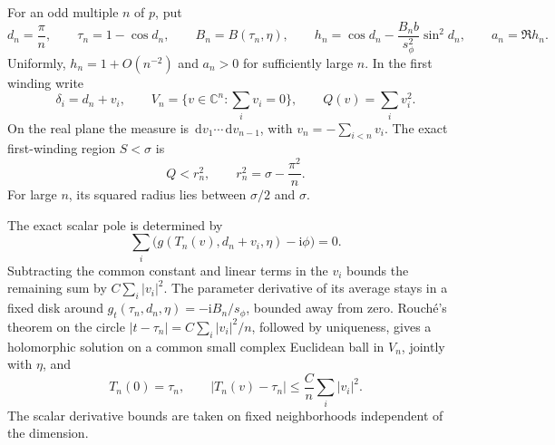\documentclass[11pt]{article}
\numberwithin{equation}{section}
\theoremstyle{definition}
\newcommand{\ii}{\mathrm i}
\newcommand{\dd}{\,\mathrm d}
\begin{document}
For an odd multiple \(n\) of \(p\), put
\begin{equation}
 d_n=\frac\pi n,\qquad \tau_n=1-\cos d_n,\qquad
 B_n=B(\tau_n,\eta),\qquad
 h_n=\cos d_n-\frac{B_nb}{s_\phi^2}\sin^2d_n,
 \qquad a_n=\Re h_n.
 \label{neg:center}
\end{equation}
Uniformly, \(h_n=1+O(n^{-2})\) and \(a_n>0\) for sufficiently
large \(n\).  In the first winding write
\[
 \delta_i=d_n+v_i,\qquad
 V_n=\{v\in\mathbb C^n:\sum_i v_i=0\},\qquad
 Q(v)=\sum_i v_i^2.
\]
On the real plane the measure is \(\dd v_1\cdots\dd v_{n-1}\),
with \(v_n=-\sum_{i<n}v_i\).  The exact first-winding region
\(S<\sigma\) is
\begin{equation}
 Q<r_n^2,\qquad r_n^2=\sigma-\frac{\pi^2}{n}.
 \label{neg:actual-real-ball}
\end{equation}
For large \(n\), its squared radius lies between \(\sigma/2\) and
\(\sigma\).

The exact scalar pole is determined by
\[
 \sum_i\bigl(g(T_n(v),d_n+v_i,\eta)-\ii\phi\bigr)=0.
\]
Subtracting the common constant and linear terms in the \(v_i\)
bounds the remaining sum by \(C\sum_i|v_i|^2\).  The parameter
derivative of its average stays in a fixed disk around
\(g_t(\tau_n,d_n,\eta)=-\ii B_n/s_\phi\), bounded away from zero.
Rouch\'e's theorem on the circle
\(|t-\tau_n|=C\sum_i|v_i|^2/n\), followed by uniqueness, gives a
holomorphic solution on a common small complex Euclidean ball in
\(V_n\), jointly with \(\eta\), and
\begin{equation}
 T_n(0)=\tau_n,\qquad
 |T_n(v)-\tau_n|\le\frac Cn\sum_i|v_i|^2.
 \label{neg:real-pole-coarse}
\end{equation}
The scalar derivative bounds are taken on fixed neighborhoods
independent of the dimension.
\end{document}

